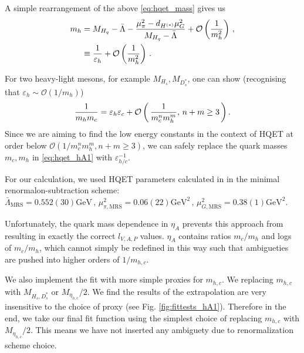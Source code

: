 A simple rearrangement of the above \eqref{eq:hqet_mass} gives us
\begin{align}
  \label{eq:epsilon_h}
  m_{h} &= M_{H_q} - \bar{\Lambda} - { \mu^2_{\pi} - d_{H^{(*)}} \mu^2_{G} \over M_{H_q} - \bar{\Lambda}} + \mathcal{O}\left({1\over m_h^2}\right)\,, \\ \nonumber
  & \equiv {1\over\varepsilon_{h}} + \mathcal{O}\left({1\over m_h^2}\right)\,.
\end{align}

For two heavy-light mesons, for example $M_{H_s},M_{D_s^*}$, one can show (recognising that $\varepsilon_{h}\sim \mathcal{O}(1/m_h)$)
\begin{align}
  {1\over m_{h} m_{c}} = \varepsilon_{h}\varepsilon_{c} + \mathcal{O}\left( \, {1\over m_c^n m_h^m}, \, n+m\geq 3 \, \right).
\end{align}
Since we are aiming to find the low energy constants in the context of HQET at order below $\mathcal{O}( 1/ m_c^n m_h^m, n+m\geq 3 )$, we can safely replace the quark masses $m_c,m_h$ in \eqref{eq:hqet_hA1} with $\varepsilon_{h/c}^{-1}$.

For our calculation, we used HQET parameters calculated in \cite{Bazavov:2018omf} in the minimal renormalon-subtraction scheme: $\bar{\Lambda}_{\text{MRS}} = 0.552(30)\text{GeV} \,,\, \mu^2_{\pi,\text{MRS}} = 0.06(22)\text{GeV}^2 \,, \, \mu^2_{G,\text{MRS}} = 0.38(1)\text{GeV}^2$.

Unfortunately, the quark mass dependence in $\eta_A$ prevents this approach from resulting in exactly the correct $l_{V,A,P}$ values. $\eta_A$ contains ratios $m_c/m_h$ and logs of $m_c/m_h$, which cannot simply be redefined in this way such that ambigueties are pushed into higher orders of $1/m_{h,c}$.

We also implement the fit with more simple proxies for $m_{h,c}$. We replacing $m_{h,c}$ with $M_{H_s,D^*_s}$ or $M_{\eta_{h,c}}/2$. We find the results of the extrapolation are very insensitive to the choice of proxy (see Fig. \ref{fig:fittests_hA1}). Therefore in the end, we take our final fit function using the simplest choice of replacing $m_{h,c}$ with $M_{\eta_{h,c}}/2$. This means we have not inserted any ambiguety due to renormalization scheme choice.


